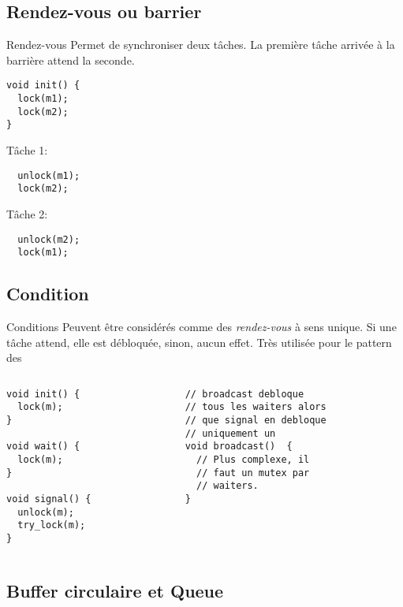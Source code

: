 \subsection{Rendez-vous ou barrier}
\begin{frame}[fragile]{Rendez-vous}
  Permet de synchroniser  deux tâches. La première tâche  arrivée à la
  barrière attend la seconde.
\begin{lstlisting} 
void init() {
  lock(m1);
  lock(m2);
}
\end{lstlisting}
Tâche 1:
\begin{lstlisting} 
  unlock(m1);
  lock(m2);
\end{lstlisting} 
Tâche 2:
\begin{lstlisting} 
  unlock(m2);
  lock(m1);
\end{lstlisting} 
\end{frame}

\subsection{Condition}

\begin{frame}[fragile]{Conditions}
  Peuvent  être   considérés  comme  des   \emph{rendez-vous}  à  sens
  unique. Si une tâche attend, elle est débloquée, sinon, aucun effet.
  Très utilisée pour le pattern des 
  \begin{columns}
    \begin{column}{5cm}
      \begin{lstlisting} 
void init() {
  lock(m);
}

void wait() {
  lock(m);
}

void signal() {
  unlock(m);
  try_lock(m);
}
      \end{lstlisting}
    \end{column}
    \begin{column}{5.5cm}
      \begin{lstlisting} 
// broadcast debloque
// tous les waiters alors
// que signal en debloque
// uniquement un
void broadcast()  {
  // Plus complexe, il
  // faut un mutex par
  // waiters. 
}
      \end{lstlisting} 
    \end{column}
  \end{columns}
\end{frame} 

\subsection{Buffer circulaire et Queue}

